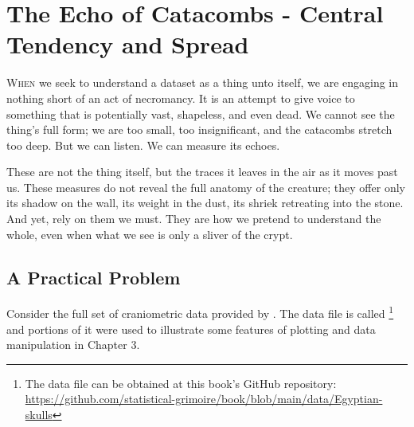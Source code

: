\chapter{The Echo of Catacombs - Central Tendency and Spread}

\IMFellEnglish
\lettrine[lines=5, realheight]{W}{hen} we seek to understand a dataset as a thing unto itself, we are engaging in nothing short of an act of necromancy. It is an attempt to give voice to something that is potentially vast, shapeless, and even dead. We cannot see the thing's full form; we are too small, too insignificant, and the catacombs stretch too deep. But we can listen. We can measure its echoes. 

These are not the thing itself, but the traces it leaves in the air as it moves past us. These measures do not reveal the full anatomy of the creature; they offer only its shadow on the wall, its weight in the dust, its shriek retreating into the stone. And yet, rely on them we must. They are how we pretend to understand the whole, even when what we see is only a sliver of the crypt.

\normalfont

\section{A Practical Problem}

Consider the full set of craniometric data provided by \textcite{Thomson1905}. The data file is called \footnote{The data file can be obtained at this book's GitHub repository: \url{https://github.com/statistical-grimoire/book/blob/main/data/Egyptian-skulls}} and portions of it were used to illustrate some features of plotting and data manipulation in Chapter 3.



